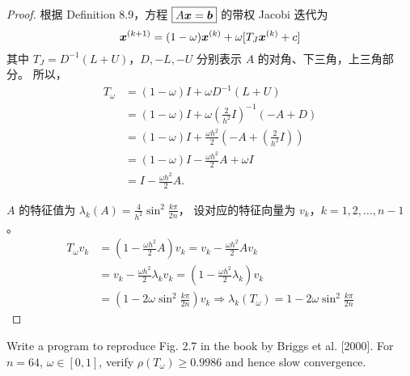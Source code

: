 \documentclass[lang=cn,a4paper,newtx,bibend=bibtex]{elegantpaper}
\begin{document}
\begin{proof}
  根据 Definition 8.9，方程 $\boxed{A\bm{x} = \bm{b}}$ 的带权 Jacobi 迭代为
  \[
    \bm{x}^{(k + 1)} = (1 - \omega) \bm{x}^{(k)} + \omega [T_J \bm{x}^{(k)} + c]
  \]
  其中 $T_J = D^{-1} (L + U)$，$D, -L, -U$ 分别表示 $A$ 的对角、下三角，上三角部分。
  所以，
  \begin{equation*}\begin{aligned}
  T_{\omega} &= (1 - \omega)I + \omega D^{-1} (L + U) \\
  &= (1 - \omega)I + \omega \left(\frac2{h^2} I\right)^{-1} (-A + D) \\
  &= (1 - \omega)I + \frac{\omega h^2}{2} \left(-A + \left(\frac2{h^2} I\right)\right) \\
  &= (1 - \omega)I - \frac{\omega h^2}{2} A + \omega I\\
  &= I - \frac{\omega h^2}{2} A.
  \end{aligned}\end{equation*}

  $A$ 的特征值为 $\lambda_k(A) = \frac4{h^2} \sin^2 \frac{k\pi}{2n}$，
  设对应的特征向量为 $v_k$，$k= 1,2,\dots, n-1$。
  \begin{equation*}
    \begin{aligned}
    T_{\omega} v_k &= \left(1 - \frac{\omega h^2}{2}A\right) v_k 
      = v_k - \frac{\omega h^2}{2} A v_k \\
      &= v_k - \frac{\omega h^2}{2}\lambda_k v_k 
      = \left(1 - \frac{\omega h^2}{2} \lambda_k\right) v_k\\
      &= \left(1 - 2\omega \sin^2 \frac{k\pi}{2n}\right) v_k
      \Rightarrow \lambda_k(T_{\omega}) = 1 - 2\omega \sin^2 \frac{k\pi}{2n}
    \end{aligned}
  \end{equation*}

  
\end{proof}

\begin{prob}[Exercise 9.18]
  Write a program to reproduce Fig. 2.7 in
  the book by Briggs et al. [2000]. For $n = 64$, $\omega \in [0, 1]$,
  verify $\rho (T_{\omega}) \ge 0.9986$ and hence slow convergence.
\end{prob}
\end{document}
